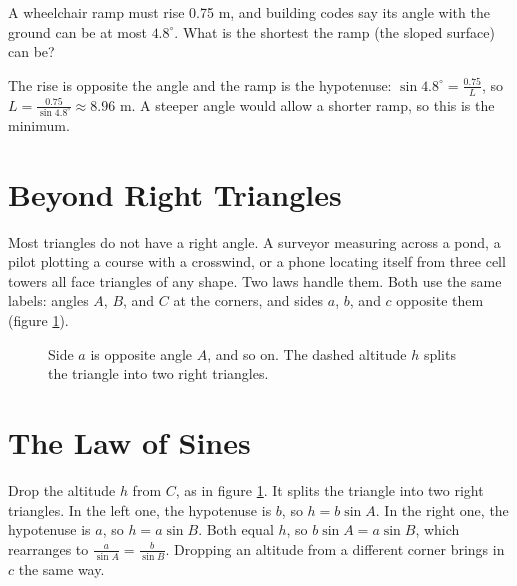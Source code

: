 \begin{Exercise}[title={Designing a Ramp}, label=rt_ramp]
A wheelchair ramp must rise 0.75 m, and building codes say its angle with the
ground can be at most $4.8^\circ$. What is the shortest the ramp (the sloped
surface) can be?
\end{Exercise}
\begin{Answer}[ref=rt_ramp]
The rise is opposite the angle and the ramp is the hypotenuse:
$\sin 4.8^\circ = \frac{0.75}{L}$, so $L = \frac{0.75}{\sin 4.8^\circ} \approx 8.96$ m.
A steeper angle would allow a shorter ramp, so this is the minimum.
\end{Answer}

\section{Beyond Right Triangles}

Most triangles do not have a right angle. A surveyor measuring across a pond,
a pilot plotting a course with a crosswind, or a phone locating itself from three
cell towers all face triangles of any shape. Two laws handle them. Both use the
same labels: angles $A$, $B$, and $C$ at the corners, and sides $a$, $b$, and $c$
opposite them (figure \ref{fig:general-triangle}).

\begin{figure}[H]
\centering
{}
\caption{Side $a$ is opposite angle $A$, and so on. The dashed altitude $h$ splits
the triangle into two right triangles.}
\label{fig:general-triangle}
\end{figure}

\section{The Law of Sines}

Drop the altitude $h$ from $C$, as in figure \ref{fig:general-triangle}. It splits
the triangle into two right triangles. In the left one, the hypotenuse is $b$, so
$h = b\sin A$. In the right one, the hypotenuse is $a$, so $h = a\sin B$. Both equal
$h$, so $b\sin A = a\sin B$, which rearranges to $\frac{a}{\sin A} = \frac{b}{\sin B}$.
Dropping an altitude from a different corner brings in $c$ the same way.

